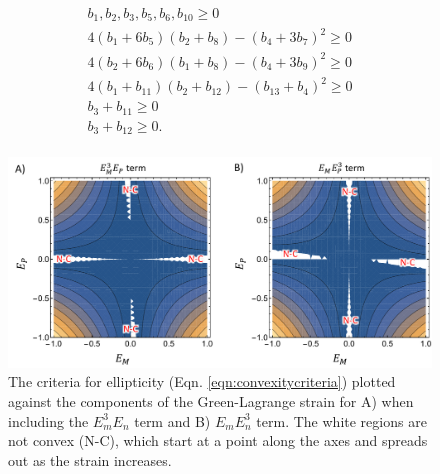 \begin{equation} \label{eqn:effmodelconstraints}
\begin{aligned}
b_1, b_2,b_3,b_5,b_6,b_{10} \geq 0	\\
4(b_1 + 6 b_5) (b_2 + b_8) - (b_4 + 3 b_7)^2 \geq 0		\\
4(b_2 + 6 b_6) (b_1 + b_8) - (b_4 + 3 b_9)^2 \geq 0 	\\
4(b_1 + b_{11}) (b_2 + b_{12}) - (b_{13} + b_4)^2 \geq 0 	\\
b_3+b_{11} \geq 0	\\
b_3+b_{12} \geq 0.	\\
\end{aligned}
\end{equation}


\begin{figure}
\centering
\includegraphics[width=6.5in]{Figures/convexitybehavior}
\caption{The criteria for ellipticity (Eqn. \ref{eqn:convexitycriteria}) plotted against the components of the Green-Lagrange strain for A) when including the $E_m^3E_n$ term and B) $E_mE_n^3$ term. The white regions are not convex (N-C), which start at a point along the axes and spreads out as the strain increases.}
\label{fig:convexitybehavior}
\end{figure}












